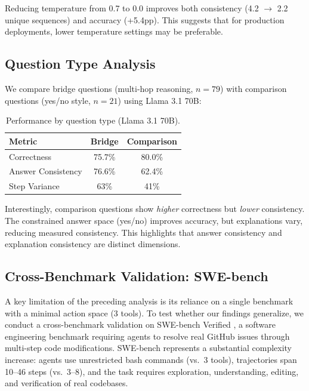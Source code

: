 \documentclass{article}
\begin{document}
Reducing temperature from 0.7 to 0.0 improves both consistency (4.2 $\rightarrow$ 2.2 unique sequences) and accuracy (+5.4pp). This suggests that for production deployments, lower temperature settings may be preferable.

\subsection{Question Type Analysis}

We compare bridge questions (multi-hop reasoning, $n=79$) with comparison questions (yes/no style, $n=21$) using Llama 3.1 70B:

\begin{table}[h]
\centering
\caption{Performance by question type (Llama 3.1 70B).}
\label{tab:qtype}
\begin{tabular}{lcc}
\toprule
\textbf{Metric} & \textbf{Bridge} & \textbf{Comparison} \\
\midrule
Correctness & 75.7\% & 80.0\% \\
Answer Consistency & 76.6\% & 62.4\% \\
Step Variance & 63\% & 41\% \\
\bottomrule
\end{tabular}
\end{table}

Interestingly, comparison questions show \emph{higher} correctness but \emph{lower} consistency. The constrained answer space (yes/no) improves accuracy, but explanations vary, reducing measured consistency. This highlights that answer consistency and explanation consistency are distinct dimensions.

\subsection{Cross-Benchmark Validation: SWE-bench}
\label{sec:swebench}

A key limitation of the preceding analysis is its reliance on a single benchmark with a minimal action space (3 tools). To test whether our findings generalize, we conduct a cross-benchmark validation on SWE-bench Verified \citep{swebench, swebench_verified}, a software engineering benchmark requiring agents to resolve real GitHub issues through multi-step code modifications. SWE-bench represents a substantial complexity increase: agents use unrestricted bash commands (vs.\ 3 tools), trajectories span 10--46 steps (vs.\ 3--8), and the task requires exploration, understanding, editing, and verification of real codebases.
\end{document}
